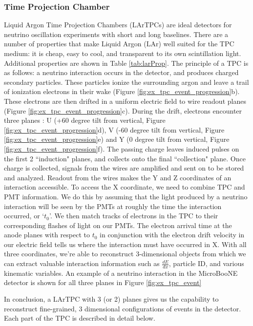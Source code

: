 \subsubsection{Time Projection Chamber} 
\par Liquid Argon Time Projection Chambers (LArTPCs) are ideal detectors for neutrino oscillation experiments with short and long baselines.  There are a number of properties that make Liquid Argon (LAr) well suited for the TPC medium: it is cheap, easy to cool, and transparent to its own scintillation light.  Additional properties are shown in Table \ref{tab:larProp}.  The principle of a TPC is as follows: a neutrino interaction occurs in the detector, and produces charged secondary particles. These particles ionize the surrounding argon and leave a trail of ionization electrons in their wake (Figure \ref{fig:ex_tpc_event_progression}b).  These electrons are then drifted in a uniform electric field to wire readout planes (Figure \ref{fig:ex_tpc_event_progression}c). During the drift, electrons encounter three planes : U (+60 degree tilt from vertical, Figure \ref{fig:ex_tpc_event_progression}d), V (-60 degree tilt from vertical, Figure \ref{fig:ex_tpc_event_progression}e) and Y (0 degree tilt from vertical, Figure \ref{fig:ex_tpc_event_progression}f).  The passing charge leaves induced pulses on the first 2 ``induction" planes, and collects onto the final ``collection" plane.  Once charge is collected, signals from the wires are amplified and sent on to be stored and analyzed. Readout from the wires makes the Y and Z coordinates of an interaction accessible. To access the X coordinate, we need to combine TPC and PMT information. We do this by assuming that the light produced by a neutrino interaction will be seen by the PMTs at roughly the time the interaction occurred, or `$t_0$'.  We then match tracks of electrons in the TPC to their corresponding flashes of light on our PMTs.  The electron arrival time at the anode planes with respect to $t_0$ in conjunction with the electron drift velocity in our electric field tells us where the interaction must have occurred in X. With all three coordinates, we're able to reconstruct 3-dimensional objects from which we can extract valuable interaction information such as $\frac{dE}{dx}$, particle ID, and various kinematic variables. An example of a neutrino interaction in the MicroBooNE detector is shown for all three planes in Figure \ref{fig:ex_tpc_event}
\par In conclusion, a LArTPC with 3 (or 2) planes gives us the capability to reconstruct fine-grained, 3 dimensional configurations of events in the detector. Each part of the TPC is described in detail below.

